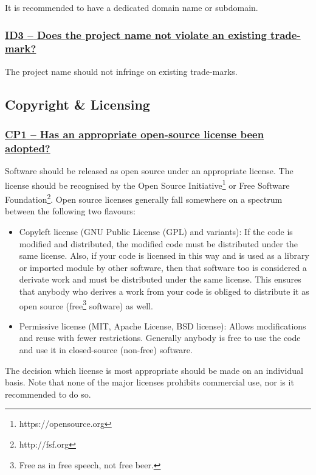 \documentclass[a4paper,11pt]{article}
\newcommand{\indicator}[1]{\subsubsection*{\underline{#1}}}
\begin{document}
It is recommended to have a dedicated domain name or subdomain.

\newcommand{\idThreeName}{ID3}
\newcommand{\idThreeID}{\idThreeName}
\newcommand{\idThreeText}{Does the project name not violate an existing trade-mark?}
\indicator{\idThreeName{ }--{ }\idThreeText}\label{id:id3} 

The project name should not infringe on existing trade-marks.

\subsection{Copyright \& Licensing}\label{sec:cop}

\newcommand{\cpOneName}{CP1}
\newcommand{\cpOneID}{\cpOneName}
\newcommand{\cpOneText}{Has an appropriate open-source license been adopted?}
\indicator{\cpOneName{ }--{ }\cpOneText}\label{id:cp1} 

Software should be released as open source under an appropriate license. The
license should be recognised by the Open Source Initiative\footnote{https://opensource.org} or Free Software
Foundation\footnote{http://fsf.org}. Open source licenses generally fall somewhere on a spectrum between the following two flavours:

\begin{itemize}
 \item Copyleft license (GNU Public License (GPL) and variants): If the code is modified and distributed, the modified code must be distributed under the same license. Also, if your code is licensed in this way and is used as a library or imported module by other software, then that software too is considered a derivate work and must be distributed under the same license. This ensures that anybody who derives a work from your code is obliged to distribute it as open source (free\footnote{Free as in free speech, not free beer.} software) as well.
 \item Permissive license (MIT, Apache License, BSD license): Allows modifications and reuse with fewer restrictions. Generally anybody is free to use the code and use it in closed-source (non-free) software.
\end{itemize}

The decision which license is most appropriate should be made on an individual
basis. Note that none of the major licenses prohibits commercial use, nor is it
recommended to do so.
\end{document}
